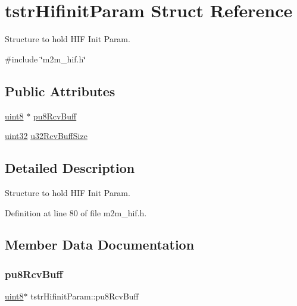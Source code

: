 \hypertarget{structtstrHifinitParam}{}\section{tstr\+Hifinit\+Param Struct Reference}
\label{structtstrHifinitParam}


Structure to hold H\+IF Init Param.  




{\ttfamily \#include \char`\"{}m2m\+\_\+hif.\+h\char`\"{}}

\subsection*{Public Attributes}
\begin{DoxyCompactItemize}
\item 
\hyperlink{group__DataT_ga4df709a77647e870bbf1d955b8edc9a6}{uint8} $\ast$ \hyperlink{structtstrHifinitParam_a8fba7791bb370e1824b8a0d0365c71c5}{pu8\+Rcv\+Buff}
\item 
\hyperlink{group__DataT_ga100e7c691a47d6978527c479a0158245}{uint32} \hyperlink{structtstrHifinitParam_a0a0ef27c7b11c7e708fc4a4e694edec2}{u32\+Rcv\+Buff\+Size}
\end{DoxyCompactItemize}


\subsection{Detailed Description}
Structure to hold H\+IF Init Param. 

Definition at line 80 of file m2m\+\_\+hif.\+h.



\subsection{Member Data Documentation}
\mbox{\label{structtstrHifinitParam_a8fba7791bb370e1824b8a0d0365c71c5}} 
\subsubsection{\texorpdfstring{pu8\+Rcv\+Buff}{pu8RcvBuff}}
{\footnotesize\ttfamily \hyperlink{group__DataT_ga4df709a77647e870bbf1d955b8edc9a6}{uint8}$\ast$ tstr\+Hifinit\+Param\+::pu8\+Rcv\+Buff}

